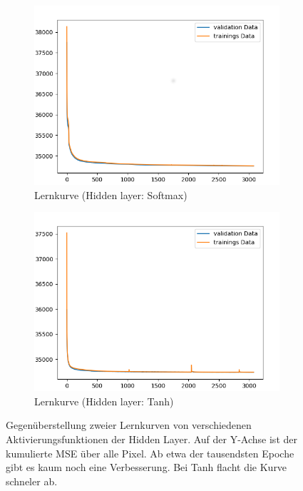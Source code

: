 \begin{figure}[ht]
\centering
\begin{subfigure}{0.5\textwidth}
\centering
\includegraphics[width=\linewidth]{pics/lernkurve_activationHidden-softmax_activationOutput-softmax}
\caption{Lernkurve (Hidden layer: Softmax)}
\label{fig:lernkurveSoftmax}
\end{subfigure}%
\begin{subfigure}{0.5\textwidth}
\centering
\includegraphics[width=\linewidth]{pics/lernkurve_activationHidden-tanh_activationOutput-softmax}
\caption{Lernkurve (Hidden layer: Tanh)}
\label{fig:lernkurveTanh}
\end{subfigure}%
\caption[Lernkurven verschiedener Aktivierungsfkt. der Hidden Layer]{Gegenüberstellung zweier Lernkurven von verschiedenen Aktivierungsfunktionen der Hidden Layer. Auf der Y-Achse ist der kumulierte MSE über alle Pixel. Ab etwa der tausendsten Epoche gibt es kaum noch eine Verbesserung. Bei Tanh flacht die Kurve schneler ab.}
\label{fig:lernkurven}
\end{figure}



